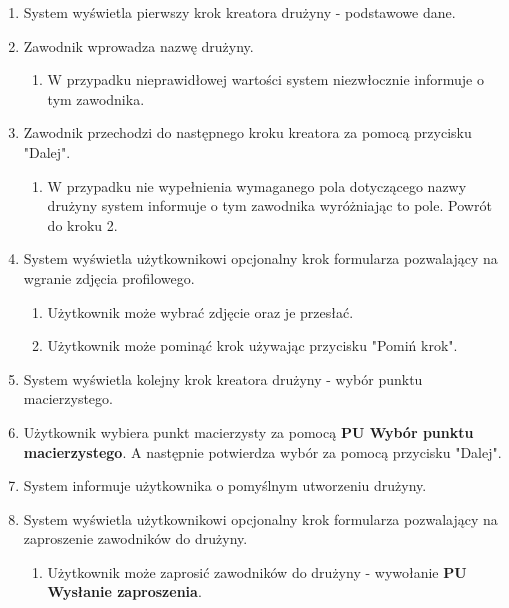 \begin{enumerate}
  \item System wyświetla pierwszy krok kreatora drużyny - podstawowe dane.
  \item Zawodnik wprowadza nazwę drużyny.
  \begin{enumerate}[label=(\alph*)]
     \item W przypadku nieprawidłowej wartości system niezwłocznie informuje o tym zawodnika.
   \end{enumerate}
  \item Zawodnik przechodzi do następnego kroku kreatora za pomocą przycisku "Dalej".
  \begin{enumerate}[label=(\alph*)]
     \item W przypadku nie wypełnienia wymaganego pola dotyczącego nazwy drużyny system informuje o tym zawodnika wyróżniając to pole. Powrót do kroku 2.
   \end{enumerate}
   
    \item System wyświetla użytkownikowi opcjonalny krok formularza pozwalający na wgranie zdjęcia profilowego.
 
  \begin{enumerate}[label=(\alph*)]
     \item Użytkownik może wybrać zdjęcie oraz je przesłać.
     \item Użytkownik może pominąć krok używając przycisku "Pomiń krok".
   \end{enumerate}
     
  \item System wyświetla kolejny krok kreatora drużyny - wybór punktu macierzystego.
  \item Użytkownik wybiera punkt macierzysty za pomocą \textbf{PU Wybór punktu macierzystego}. A następnie potwierdza wybór za pomocą przycisku "Dalej".
  \item System informuje użytkownika o pomyślnym utworzeniu drużyny.
  \item System wyświetla użytkownikowi opcjonalny krok formularza pozwalający na zaproszenie zawodników do drużyny.
  
  \begin{enumerate}[label=(\alph*)]
     \item Użytkownik może zaprosić zawodników do drużyny - wywołanie \textbf{PU Wysłanie zaproszenia}.
   \end{enumerate}
 
\end{enumerate}


